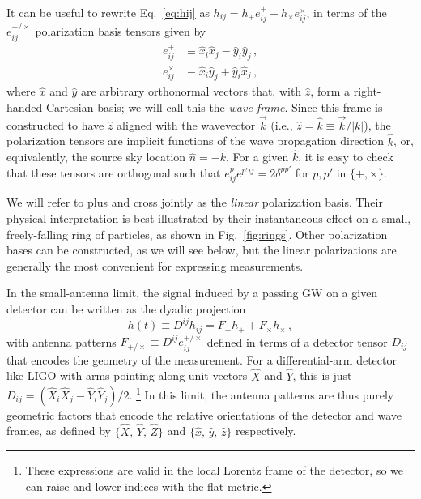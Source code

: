 \documentclass[aps,prd,twocolumn,superscriptaddress,preprintnumbers,floatfix,nofootinbib]{revtex4-2}
\newcommand{\beq}{\begin{equation}}
\newcommand{\eeq}{\end{equation}}
\newcommand*{\eq}[1]{Eq.~\eqref{eq:#1}}
\begin{document}
It can be useful to rewrite \eq{hij} as $h_{ij} = h_+ e^+_{ij} + h_\times e^\times_{ij}$, in terms of the $e^{+/\times}_{ij}$ polarization basis tensors given by
\begin{subequations} \label{eq:lin}
\begin{align}
e^+_{ij} &\equiv \hat{x}_i \hat{x}_j - \hat{y}_i \hat{y}_j \, ,\\
e^\times_{ij} &\equiv \hat{x}_i \hat{y}_j + \hat{y}_i \hat{x}_j\, ,
\end{align}
\end{subequations}
where $\hat{x}$ and $\hat{y}$ are arbitrary orthonormal vectors that, with $\hat{z}$, form a right-handed Cartesian basis; we will call this the \emph{wave frame}.
Since this frame is constructed to have $\hat{z}$ aligned with the wavevector $\vec{k}$ (i.e., $\hat{z} = \hat{k} \equiv \vec{k}/|k|$), the polarization tensors are implicit functions of the wave propagation direction $\hat{k}$, or, equivalently, the source sky location $\hat{n} = -\hat{k}$.
For a given $\hat{k}$, it is easy to check that these tensors are orthogonal such that $e^p_{ij} e^{p'ij}=2\delta^{pp'}$ for $p,p'$ in $\{+,\times\}$.

We will refer to plus and cross jointly as the \emph{linear} polarization basis.
Their physical interpretation is best illustrated by their instantaneous effect on a small, freely-falling ring of particles, as shown in Fig.~\ref{fig:rings}.
Other polarization bases can be constructed, as we will see below, but the linear polarizations are generally the most convenient for expressing measurements.

In the small-antenna limit, the signal induced by a passing GW on a given detector can be written as the dyadic projection
\beq \label{eq:h}
h(t) \equiv D^{ij} h_{ij} = F_+ h_+ + F_\times h_\times\, ,
\eeq
with antenna patterns $F_{+/\times} \equiv D^{ij} e^{+/\times}_{ij}$ defined in terms of a detector tensor $D_{ij}$ that encodes the geometry of the measurement.
For a differential-arm detector like LIGO with arms pointing along unit vectors $\hat{X}$ and $\hat{Y}$, this is just $D_{ij} = (\hat{X}_i \hat{X}_j - \hat{Y}_i \hat{Y}_j)/2$.%
\footnote{These expressions are valid in the local Lorentz frame of the detector, so we can raise and lower indices with the flat metric.}
In this limit, the antenna patterns are thus purely geometric factors that encode the relative orientations of the detector and wave frames, as defined by $\{\hat{X},\, \hat{Y},\, \hat{Z}\}$ and $\{\hat{x},\, \hat{y},\, \hat{z}\}$ respectively.
\end{document}
